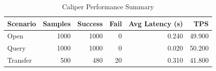 \begin{table}
\caption{Caliper Performance Summary}
\label{tab:caliper_round}
\begin{tabular}{lrrrrr}
\toprule
Scenario & Samples & Success & Fail & Avg Latency (s) & TPS \\
\midrule
Open & 1000 & 1000 & 0 & 0.240 & 49.900 \\
Query & 1000 & 1000 & 0 & 0.020 & 50.200 \\
Transfer & 500 & 480 & 20 & 0.310 & 41.800 \\
\bottomrule
\end{tabular}
\end{table}
